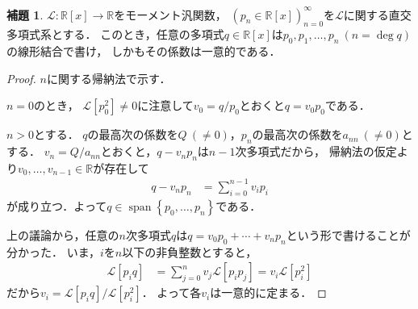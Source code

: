 \documentclass{jlreq}
\theoremstyle{definition}
\newtheorem{lemma}[theorem]{補題}
\newcommand{\functype}[3]{#1\colon#2\longrightarrow#3}
\newcommand{\mcL}{\mathcal{L}}
\newcommand{\polynoms}[2]{#1[#2]}
\newcommand{\realnums}{\mathbb{R}}
\newcommand{\sequence}[3]{\sequenceparen{#1}{#2}{#3}{(}{)}} %
\newcommand{\sequenceparen}[5]{{#4#1#5}_{#2}^{#3}}
\newcommand{\setbrace}[1]{\left\{#1\right\}} %
\DeclareMathOperator{\spanset}{span}
\begin{document}
\begin{lemma}%
  \label{thm:orthp.basis}
  \(\functype{\mcL}{\polynoms{\realnums}{x}}{\realnums}\)をモーメント汎関数，
  \(\sequence{p_n\in\polynoms{\realnums}{x}}{n=0}{\infty}\)を\(\mcL\)に関する直交多項式系とする．
  このとき，任意の多項式\(q\in\polynoms{\realnums}{x}\)は\(p_0,p_1,\dots,p_n\:(n=\deg q)\)の線形結合で書け，
  しかもその係数は一意的である．
\end{lemma}
\begin{proof}
  \(n\)に関する帰納法で示す．

  \(n=0\)のとき，
  \(\mcL[p_0^2]\neq0\)に注意して\(v_0=q/p_0\)とおくと\(q=v_0 p_0\)である．

  \(n>0\)とする．
  \(q\)の最高次の係数を\(Q\:(\neq0)\)，\(p_n\)の最高次の係数を\(a_{nn}\:(\neq0)\)とする．
  \(v_n=Q/a_{nn}\)とおくと，\(q-v_n p_n\)は\(n-1\)次多項式だから，
  帰納法の仮定より\(v_0,\dots,v_{n-1}\in\realnums\)が存在して
  \begin{align}
    q-v_n p_n &= \sum_{i=0}^{n-1} v_i p_i
  \end{align}
  が成り立つ．よって\(q\in\spanset{\setbrace{p_0,\dots,p_n}}\)である．

  上の議論から，任意の\(n\)次多項式\(q\)は\(q=v_0 p_0+\cdots+v_n p_n\)という形で書けることが分かった．
  いま，\(i\)を\(n\)以下の非負整数とすると，
  \begin{align}
    \mcL[p_i q]
    &= \sum_{j=0}^n v_j \mcL[p_i p_j]
     = v_i \mcL[p_i^2]
    \label{eq:orthp.basis.piq}
  \end{align}
  だから\(v_i=\mcL[p_i q]/\mcL[p_i^2]\)．
  よって各\(v_i\)は一意的に定まる．
\end{proof}
\end{document}
